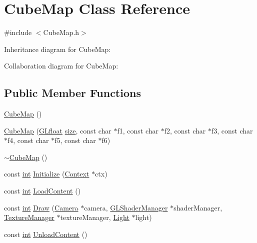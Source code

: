 \hypertarget{class_cube_map}{\section{Cube\-Map Class Reference}
\label{class_cube_map}
}


{\ttfamily \#include $<$Cube\-Map.\-h$>$}



Inheritance diagram for Cube\-Map\-:


Collaboration diagram for Cube\-Map\-:
\subsection*{Public Member Functions}
\begin{DoxyCompactItemize}
\item 
\hyperlink{class_cube_map_ac33e45b385642ae69ab71e7d6842599f}{Cube\-Map} ()
\item 
\hyperlink{class_cube_map_ae353c8cedf5dd5be73e6b8ffe4f3283e}{Cube\-Map} (\hyperlink{_g_l_e_w_2glew_8h_a4a966015c733cb5fe2733de64a62a3a5}{G\-Lfloat} \hyperlink{_g_l_e_w_2glew_8h_a3d1e3edfcf61ca2d831883e1afbad89e}{size}, const char $\ast$f1, const char $\ast$f2, const char $\ast$f3, const char $\ast$f4, const char $\ast$f5, const char $\ast$f6)
\item 
\hyperlink{class_cube_map_ac4c453248cd7022d3b268755b2dd218e}{$\sim$\-Cube\-Map} ()
\item 
const \hyperlink{_s_d_l__thread_8h_a6a64f9be4433e4de6e2f2f548cf3c08e}{int} \hyperlink{class_cube_map_a92749bd350f8ef7cc1756ae594fb13cb}{Initialize} (\hyperlink{class_context}{Context} $\ast$ctx)
\item 
const \hyperlink{_s_d_l__thread_8h_a6a64f9be4433e4de6e2f2f548cf3c08e}{int} \hyperlink{class_cube_map_abe52d03d57c5f06af7d2dcc1ea71d8c8}{Load\-Content} ()
\item 
const \hyperlink{_s_d_l__thread_8h_a6a64f9be4433e4de6e2f2f548cf3c08e}{int} \hyperlink{class_cube_map_a9ff635417dbd47065b242f68c4685d0d}{Draw} (\hyperlink{class_camera}{Camera} $\ast$camera, \hyperlink{class_g_l_shader_manager}{G\-L\-Shader\-Manager} $\ast$shader\-Manager, \hyperlink{class_texture_manager}{Texture\-Manager} $\ast$texture\-Manager, \hyperlink{class_light}{Light} $\ast$light)
\item 
const \hyperlink{_s_d_l__thread_8h_a6a64f9be4433e4de6e2f2f548cf3c08e}{int} \hyperlink{class_cube_map_a4e9bdd98cbbda69dca5f9a3e0dc2d96b}{Unload\-Content} ()
\end{DoxyCompactItemize}

